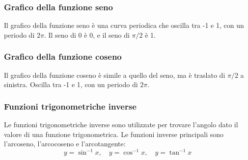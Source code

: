 \documentclass{article}
\begin{document}
\subsubsection{Grafico della funzione seno}
Il grafico della funzione seno è una curva periodica che oscilla tra -1 e 1, con un periodo
di \(2\pi\). Il seno di 0 è 0, e il seno di \(\pi/2\) è 1.


\subsubsection{Grafico della funzione coseno}
Il grafico della funzione coseno è simile a quello del seno, ma è traslato di \(\pi/2\) a
sinistra. Oscilla tra -1 e 1, con un periodo di \(2\pi\).


\subsubsection{Funzioni trigonometriche inverse}
Le funzioni trigonometriche inverse sono utilizzate per trovare l'angolo dato il valore di
una funzione trigonometrica. Le funzioni inverse principali sono l'arcoseno, l'arcocoseno e
l'arcotangente:
\[
    y = \sin^{-1} x, \quad y = \cos^{-1} x, \quad y = \tan^{-1} x
\]
\end{document}
